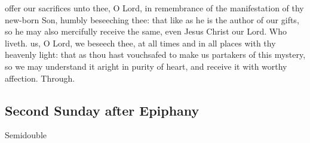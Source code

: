 \secret
{} offer our sacrifices unto thee, O Lord, in remembrance of the manifestation of thy new-born Son, humbly beseeching thee: that like as he is the author of our gifts, so he may also mercifully receive the same, even Jesus Christ our Lord. Who liveth.
\postcommunion
{} us, O Lord, we beseech thee, at all times and in all places with thy heavenly light: that as thou hast vouchsafed to make us partakers of this mystery, so we may understand it aright in purity of heart, and receive it with worthy affection. Through.


\clearpage
\subsection{Second Sunday after Epiphany}\label{EpiphanyII}
\begin{inhead}
{Semidouble}
\end{inhead}


